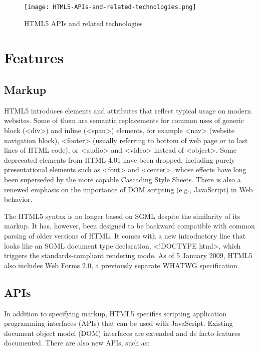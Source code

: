 \begin{figure}[!h]
\centering
\texttt{[image: HTML5-APIs-and-related-technologies.png]}
\caption{HTML5 APIs and related technologies}
\label{HTML5-APIs-and-related-technologies}
\end{figure}

\chapter{Features}




\section{Markup}


HTML5 introduces elements and attributes that reflect typical usage on modern websites. Some of them are semantic replacements for common uses of generic block (<div>) and inline (<span>) elements, for example <nav> (website navigation block), <footer> (usually referring to bottom of web page or to last lines of HTML code), or <audio> and <video> instead of <object>. Some deprecated elements from HTML 4.01 have been dropped, including purely presentational elements such as <font> and <center>, whose effects have long been superseded by the more capable Cascading Style Sheets. There is also a renewed emphasis on the importance of DOM scripting (e.g., JavaScript) in Web behavior.

The HTML5 syntax is no longer based on SGML despite the similarity of its markup. It has, however, been designed to be backward compatible with common parsing of older versions of HTML. It comes with a new introductory line that looks like an SGML document type declaration, <!DOCTYPE html>, which triggers the standards-compliant rendering mode. As of 5 January 2009, HTML5 also includes Web Forms 2.0, a previously separate WHATWG specification.



\section{APIs}


In addition to specifying markup, HTML5 specifies scripting application programming interfaces (APIs) that can be used with JavaScript. Existing document object model (DOM) interfaces are extended and de facto features documented. There are also new APIs, such as:

